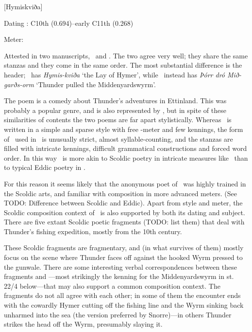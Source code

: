 [Hymiskviða]

\begin{flushright}%
Dating \parencite{Sapp2022}: C10th (0.694)–early C11th (0.268)

Meter: \Fornyrdislag%
\end{flushright}%

Attested in two manuscripts, \Regius\ and \AM.  The two agree very well; they share the same stanzas and they come in the same order.  The most substantial difference is the header; \AM\ has \emph{Hymis-kviða} ‘the Lay of Hymer’, while \Regius\ instead has \emph{Þórr dró Mið-garðs-orm} ‘Thunder pulled the Middenyardswyrm’.

The poem is a comedy about Thunder’s adventures in Ettinland.  This was probably a popular genre, and is also represented by \Thrymskvida, but in spite of these similarities of contents the two poems are far apart stylistically.  Whereas \Thrymskvida\ is written in a simple and sparse style with free \Fornyrdislag-meter and few kennings, the form of \Fornyrdislag\ used in \Hymiskvida\ is unusually strict, almost syllable-counting, and the stanzas are filled with intricate kennings, difficult grammatical constructions and forced word order.  In this way \Hymiskvida\ is more akin to Scoldic poetry in intricate measures like \Drottkvett\ than to typical Eddic poetry in \Fornyrdislag.

For this reason it seems likely that the anonymous poet of \Hymiskvida\ was highly trained in the Scoldic arts, and familiar with composition in more advanced meters.  (See TODO: Difference between Scoldic and Eddic).  Apart from style and meter, the Scoldic composition context of \Hymiskvida\ is also supported by both its dating and subject.  There are five extant Scoldic poetic fragments (TODO: list them) that deal with Thunder’s fishing expedition, mostly from the 10th century.

These Scoldic fragments are fragmentary, and (in what survives of them) mostly focus on the scene where Thunder faces off against the hooked Wyrm pressed to the gunwale.  There are some interesting verbal correspondences between these fragments and \Hymiskvida—most strikingly the kenning for the Middenyardswyrm in st. 22/4 below—that may also support a common composition context.  The fragments do not all agree with each other; in some of them the encounter ends with the cowardly Hymer cutting off the fishing line and the Wyrm sinking back unharmed into the sea (the version preferred by Snorre)—in others Thunder strikes the head off the Wyrm, presumably slaying it.

